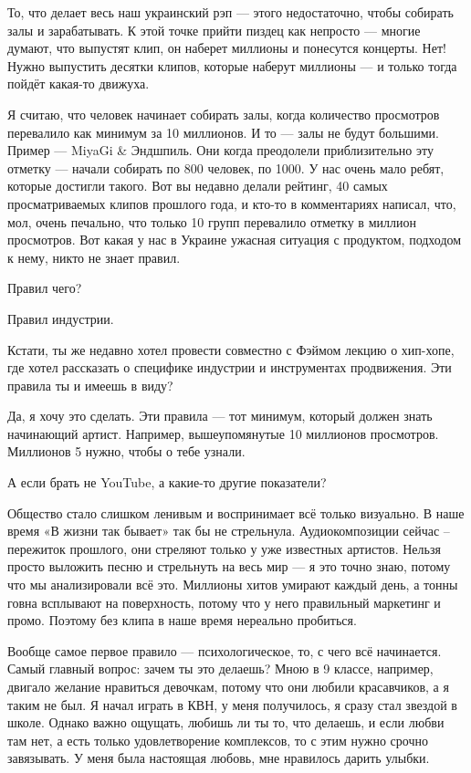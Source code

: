 То, что делает весь наш украинский рэп --- этого недостаточно, чтобы собирать залы и зарабатывать. К этой точке прийти пиздец как непросто --- многие думают, что выпустят клип, он наберет миллионы и понесутся концерты. Нет! Нужно выпустить десятки клипов, которые наберут миллионы --- и только тогда пойдёт какая-то движуха.

Я считаю, что человек начинает собирать залы, когда количество просмотров перевалило как минимум за 10 миллионов. И то --- залы не будут большими. Пример --- MiyaGi & Эндшпиль. Они когда преодолели приблизительно эту отметку --- начали собирать по 800 человек, по 1000. У нас очень мало ребят, которые достигли такого. Вот вы недавно делали рейтинг, 40 самых просматриваемых клипов прошлого года, и кто-то в комментариях написал, что, мол, очень печально, что только 10 групп перевалило отметку в миллион просмотров. Вот какая у нас в Украине ужасная ситуация с продуктом, подходом к нему, никто не знает правил.

Правил чего?

Правил индустрии.

Кстати, ты же недавно хотел провести совместно с Фэймом лекцию о хип-хопе, где
хотел рассказать о специфике индустрии и инструментах продвижения. Эти правила
ты и имеешь в виду?

Да, я хочу это сделать. Эти правила --- тот минимум, который должен знать
начинающий артист. Например, вышеупомянутые 10 миллионов просмотров. Миллионов
5 нужно, чтобы о тебе узнали.

А если брать не YouTube, а какие-то другие показатели?

Общество стало слишком ленивым и воспринимает всё только визуально. В наше
время «В жизни так бывает» так бы не стрельнула. Аудиокомпозиции сейчас –
пережиток прошлого, они стреляют только у уже известных артистов. Нельзя просто
выложить песню и стрельнуть на весь мир --- я это точно знаю, потому что мы
анализировали всё это. Миллионы хитов умирают каждый день, а тонны говна
всплывают на поверхность, потому что у него правильный маркетинг и промо.
Поэтому без клипа в наше время нереально пробиться.

Вообще самое первое правило --- психологическое, то, с чего всё начинается. Самый
главный вопрос: зачем ты это делаешь? Мною в 9 классе, например, двигало
желание нравиться девочкам, потому что они любили красавчиков, а я таким не
был. Я начал играть в КВН, у меня получилось, я сразу стал звездой в школе.
Однако важно ощущать, любишь ли ты то, что делаешь, и если любви там нет, а
есть только удовлетворение комплексов, то с этим нужно срочно завязывать. У
меня была настоящая любовь, мне нравилось дарить улыбки.

